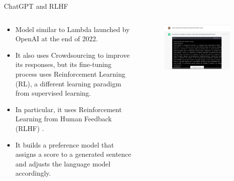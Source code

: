 \documentclass[handout]{beamer}
\begin{document}
\begin{frame}{ChatGPT and RLHF}
\begin{columns}[T]
\begin{column}{0.5\textwidth}
\begin{scriptsize}
\begin{itemize}
\item Model similar to Lambda launched by OpenAI at the end of 2022.
\item It also uses Crowdsourcing to improve its responses, but its fine-tuning process uses Reinforcement Learning (RL), a different learning paradigm from supervised learning.
\item In particular, it uses Reinforcement Learning from Human Feedback (RLHF) \cite{ouyang2022training}.
\item It builds a preference model that assigns a score to a generated sentence and adjusts the language model accordingly.
\end{itemize}
\end{scriptsize}
\end{column}
\begin{column}{0.5\textwidth}
\begin{figure}[h]
	\includegraphics[scale = 0.25]{pics/chatgpt.png}
\end{figure}
\end{column}
\end{columns}
\end{frame}
\end{document}
